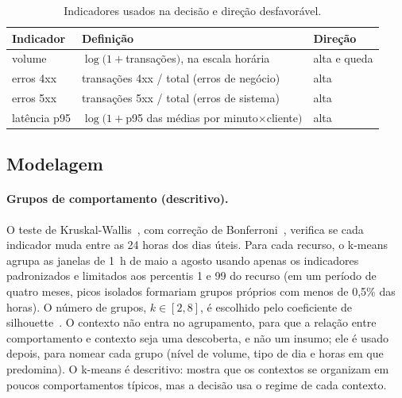 \documentclass[sigconf,nonacm]{acmart}
\begin{document}
\begin{table}[t]
  \caption{Indicadores usados na decisão e direção desfavorável.}
  \label{tab:atributos}
  \small
  \begin{tabular}{p{}p{}p{}}
    \toprule
    Indicador & Definição & Direção \\
    \midrule
    volume & $\log(1+$transações$)$, na escala horária & alta e queda \\
    erros 4xx & transações 4xx / total (erros de negócio) & alta \\
    erros 5xx & transações 5xx / total (erros de sistema) & alta \\
    latência p95 & $\log(1+$p95 das médias por minuto$\times$cliente$)$ & alta \\
    \bottomrule
  \end{tabular}
\end{table}

\subsection{Modelagem}

\paragraph{Grupos de comportamento (descritivo).} O teste de Kruskal-Wallis~\citep{kruskal1952ranks}, com correção de Bonferroni~\citep{dunn1961multiple}, verifica se cada indicador muda entre as 24 horas dos dias úteis. Para cada recurso, o k-means~\citep{lloyd1982kmeans} agrupa as janelas de 1~h de maio a agosto usando apenas os indicadores padronizados e limitados aos percentis 1 e 99 do recurso (em um período de quatro meses, picos isolados formariam grupos próprios com menos de 0,5\% das horas). O número de grupos, $k\in[2,8]$, é escolhido pelo coeficiente de silhouette~\citep{rousseeuw1987silhouette}. O contexto não entra no agrupamento, para que a relação entre comportamento e contexto seja uma descoberta, e não um insumo; ele é usado depois, para nomear cada grupo (nível de volume, tipo de dia e horas em que predomina). O k-means é descritivo: mostra que os contextos se organizam em poucos comportamentos típicos, mas a decisão usa o regime de cada contexto.
\end{document}
